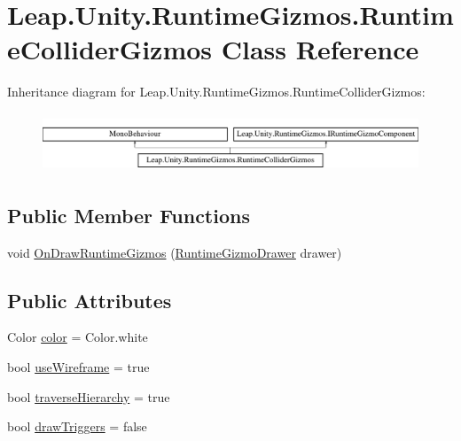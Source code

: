 \hypertarget{class_leap_1_1_unity_1_1_runtime_gizmos_1_1_runtime_collider_gizmos}{}\section{Leap.\+Unity.\+Runtime\+Gizmos.\+Runtime\+Collider\+Gizmos Class Reference}
\label{class_leap_1_1_unity_1_1_runtime_gizmos_1_1_runtime_collider_gizmos}
Inheritance diagram for Leap.\+Unity.\+Runtime\+Gizmos.\+Runtime\+Collider\+Gizmos\+:\begin{figure}[H]
\begin{center}
\leavevmode
\includegraphics[height=1.772152cm]{class_leap_1_1_unity_1_1_runtime_gizmos_1_1_runtime_collider_gizmos}
\end{center}
\end{figure}
\subsection*{Public Member Functions}
\begin{DoxyCompactItemize}
\item 
void \mbox{\hyperlink{class_leap_1_1_unity_1_1_runtime_gizmos_1_1_runtime_collider_gizmos_af781c99e4d3b838bfc69d5733071a936}{On\+Draw\+Runtime\+Gizmos}} (\mbox{\hyperlink{class_leap_1_1_unity_1_1_runtime_gizmos_1_1_runtime_gizmo_drawer}{Runtime\+Gizmo\+Drawer}} drawer)
\end{DoxyCompactItemize}
\subsection*{Public Attributes}
\begin{DoxyCompactItemize}
\item 
Color \mbox{\hyperlink{class_leap_1_1_unity_1_1_runtime_gizmos_1_1_runtime_collider_gizmos_af068a98b25808761c0bb2d060dae4fdd}{color}} = Color.\+white
\item 
bool \mbox{\hyperlink{class_leap_1_1_unity_1_1_runtime_gizmos_1_1_runtime_collider_gizmos_a7d5bb0e09a624d7dfed9f0edb51082d4}{use\+Wireframe}} = true
\item 
bool \mbox{\hyperlink{class_leap_1_1_unity_1_1_runtime_gizmos_1_1_runtime_collider_gizmos_acc8f81d913e2199b1c14b898573d16f0}{traverse\+Hierarchy}} = true
\item 
bool \mbox{\hyperlink{class_leap_1_1_unity_1_1_runtime_gizmos_1_1_runtime_collider_gizmos_af2b0e701a3cd4123da798cfded7ccec7}{draw\+Triggers}} = false
\end{DoxyCompactItemize}


